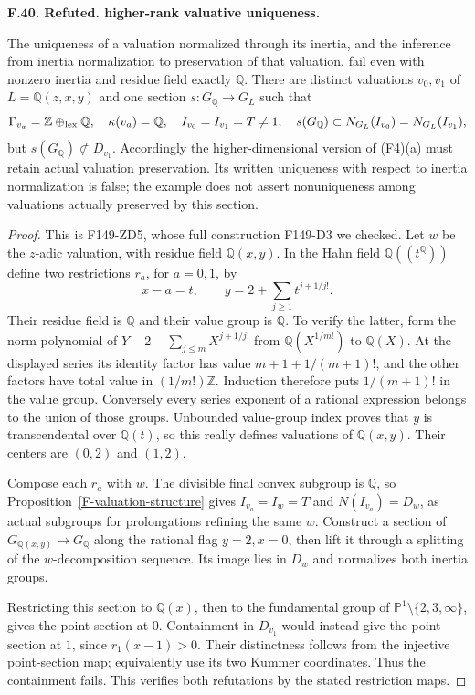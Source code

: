 \documentclass[11pt,oneside]{article}
\makeatletter
\newcounter{statementanchor}
\newenvironment{statement}[3]{%
 \refstepcounter{statementanchor}\def\@currentlabel{#1}%
 \par\addvspace{9pt}\noindent
 \textbf{#1. #2. #3.}\par\nobreak\noindent\ignorespaces
}{\par\addvspace{5pt}}
\makeatother
\begin{document}
\begin{statement}{F.40}{Refuted}{higher-rank valuative uniqueness}
\label{st:F.40}
\label{F-valuation-nonuniqueness}
The uniqueness of a valuation normalized through its inertia,
and the inference from inertia normalization to preservation
of that valuation, fail even with nonzero inertia and residue
field exactly $\mathbb Q$. There are distinct valuations
$v_0,v_1$ of $L=\mathbb Q(z,x,y)$ and one section
$s:G_{\mathbb Q}\to G_L$ such that
\[
 \Gamma_{v_a}=\mathbb Z\oplus_{\rm lex}\mathbb Q,
 \quad\kappa(v_a)=\mathbb Q,
 \quad I_{v_0}=I_{v_1}=T\ne1,
 \quad s(G_{\mathbb Q})\subset N_{G_L}(I_{v_0})
                             =N_{G_L}(I_{v_1}),
\]
but $s(G_{\mathbb Q})\not\subset D_{v_1}$. Accordingly the
higher-dimensional version of (F4)(a) must retain actual
valuation preservation. Its written uniqueness with respect to
inertia normalization is false; the example does not assert
nonuniqueness among valuations actually preserved by this section.
\end{statement}
\begin{proof}
This is F149-ZD5, whose full construction F149-D3 we checked.
Let $w$ be the $z$-adic valuation, with residue field
$\mathbb Q(x,y)$. In the Hahn field $\mathbb Q((t^{\mathbb Q}))$
define two restrictions $r_a$, for $a=0,1$, by
\[
 x-a=t,\qquad y=2+\sum_{j\ge1}t^{j+1/j!}.
\]
Their residue field is $\mathbb Q$ and their value group is
$\mathbb Q$. To verify the latter, form the norm polynomial
of $Y-2-\sum_{j\le m}X^{j+1/j!}$ from
$\mathbb Q(X^{1/m!})$ to $\mathbb Q(X)$. At the displayed
series its identity factor has value
$m+1+1/(m+1)!$, and the other factors have total value in
$(1/m!)\mathbb Z$. Induction therefore puts $1/(m+1)!$ in
the value group. Conversely every series exponent of a
rational expression belongs to the union of those groups.
Unbounded value-group index proves that $y$ is transcendental
over $\mathbb Q(t)$, so this really defines valuations of
$\mathbb Q(x,y)$. Their centers are $(0,2)$ and $(1,2)$.

Compose each $r_a$ with $w$. The divisible final convex
subgroup is $\mathbb Q$, so
Proposition~\ref{F-valuation-structure} gives
$I_{v_a}=I_w=T$ and $N(I_{v_a})=D_w$, as actual subgroups
for prolongations refining the same $w$. Construct a section
of $G_{\mathbb Q(x,y)}\to G_{\mathbb Q}$ along the rational
flag $y=2,x=0$, then lift it through a splitting of the
$w$-decomposition sequence. Its image lies in $D_w$ and
normalizes both inertia groups.

Restricting this section to $\mathbb Q(x)$, then to the
fundamental group of
$\mathbb P^1\setminus\{2,3,\infty\}$, gives the point
section at $0$. Containment in $D_{v_1}$ would instead give
the point section at $1$, since $r_1(x-1)>0$. Their distinctness
follows from the injective point-section map; equivalently
use its two Kummer coordinates. Thus the containment fails.
This verifies both refutations by the stated restriction maps.
\end{proof}
\end{document}
